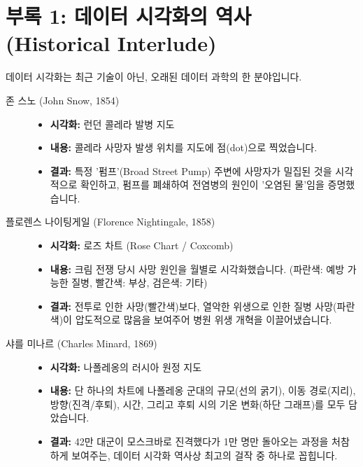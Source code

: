 \documentclass[11pt,a4paper]{book}
\theoremstyle{definition}
\begin{document}
\section{부록 1: 데이터 시각화의 역사 (Historical Interlude)}

데이터 시각화는 최근 기술이 아닌, 오래된 데이터 과학의 한 분야입니다.

\begin{description}
    \item[존 스노 (John Snow, 1854)]
    \begin{itemize}
        \item \textbf{시각화:} 런던 콜레라 발병 지도
        \item \textbf{내용:} 콜레라 사망자 발생 위치를 지도에 점(dot)으로 찍었습니다.
        \item \textbf{결과:} 특정 '펌프'(Broad Street Pump) 주변에 사망자가 밀집된 것을 시각적으로 확인하고, 펌프를 폐쇄하여 전염병의 원인이 '오염된 물'임을 증명했습니다.
    \end{itemize}

    \item[플로렌스 나이팅게일 (Florence Nightingale, 1858)]
    \begin{itemize}
        \item \textbf{시각화:} 로즈 차트 (Rose Chart / Coxcomb)
        \item \textbf{내용:} 크림 전쟁 당시 사망 원인을 월별로 시각화했습니다. (파란색: 예방 가능한 질병, 빨간색: 부상, 검은색: 기타)
        \item \textbf{결과:} 전투로 인한 사망(빨간색)보다, 열악한 위생으로 인한 질병 사망(파란색)이 압도적으로 많음을 보여주어 병원 위생 개혁을 이끌어냈습니다.
    \end{itemize}

    \item[샤를 미나르 (Charles Minard, 1869)]
    \begin{itemize}
        \item \textbf{시각화:} 나폴레옹의 러시아 원정 지도
        \item \textbf{내용:} 단 하나의 차트에 나폴레옹 군대의 규모(선의 굵기), 이동 경로(지리), 방향(진격/후퇴), 시간, 그리고 후퇴 시의 기온 변화(하단 그래프)를 모두 담았습니다.
        \item \textbf{결과:} 42만 대군이 모스크바로 진격했다가 1만 명만 돌아오는 과정을 처참하게 보여주는, 데이터 시각화 역사상 최고의 걸작 중 하나로 꼽힙니다.
    \end{itemize}
\end{description}
\end{document}
